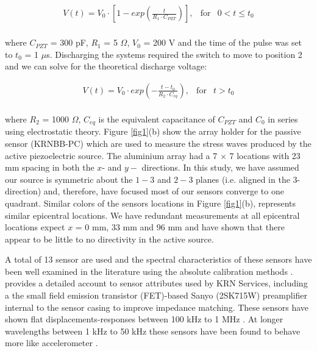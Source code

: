 \documentclass[preprint,3p, 11pt,authoryear]{elsarticle}
\begin{document}
\begin{equation}
\begin{array}{lcc}
  V(t) =  V_{0} \cdot \left[ 1 - exp\left(\frac{t}{R_{1}\cdot C_{PZT}} \right) \right], & \text{for} & 0 < t \leq t_{0}\\
\end{array}
\label{eq1}
\end{equation}

\noindent where $C_{PZT}$ = 300 pF, $R_{1}$ = 5 $\Omega$, $V_{0}$ = 200 V and the time of the pulse was set to $t_{0}$ = 1 $\mu$s. Discharging the systems required the switch to move to position 2 and we can solve for the theoretical discharge voltage:

\begin{equation}
\begin{array}{lclcc}
  V(t) =  V_{0} \cdot exp\left(-\frac{t - t_{0}}{R_{2}\cdot C_{eq}}\right), & \text{for} & t > t_{0}\\
\end{array}
\label{eq2}
\end{equation}

\noindent where $R_{2}$ = 1000 $\Omega$, $C_{eq}$ is the equivalent capacitance of $C_{PZT}$ and $C_{0}$ in series using electrostatic theory.  Figure \ref{fig1}(b) show the array holder for the passive sensor (KRNBB-PC) which are used to measure the stress waves produced by the active piezoelectric source. The aluminium array had a 7 $\times$ 7 locations with 23 mm spacing in both the $x$- and $y-$ directions.  In this study, we have assumed our source is symmetric about the $1-3$ and $2-3$ planes (i.e. aligned in the $3$-direction) and, therefore, have focused most of our sensors converge to one quadrant.  Similar colors of the sensors locations in Figure \ref{fig1}(b), represents similar epicentral locations.  We have redundant measurements at all epicentral locations expect $x$ = 0 mm, 33 mm and 96 mm and have shown that there appear to be little to no directivity in the active source.  

A total of 13 sensor are used and the spectral characteristics of these sensors have been well examined in the literature using the absolute calibration methods \citep{Glaser1998, McLaskey2010, McLaskey2012, Selvadurai2015, Selvadurai2019, Wu2020}. \citet{Glaser1998} provides a detailed account to sensor attributes used by KRN Services, including a the small field emission transistor (FET)-based Sanyo (2SK715W) preamplifier internal to the sensor casing to improve impedance matching.  These sensors have shown flat displacements-responses between 100 kHz to 1 MHz \citep{McLaskey2012, Selvadurai2019}.  At longer wavelengths between 1 kHz to 50 kHz these sensors have been found to behave more like accelerometer \citep{Wu2020}.
\end{document}

